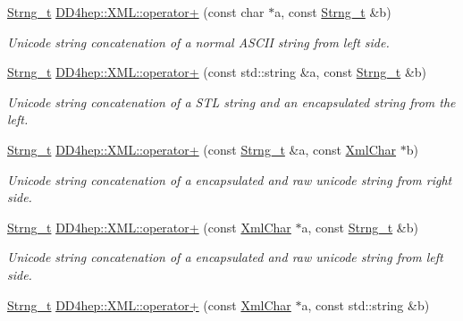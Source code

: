 \begin{DoxyCompactItemize}
\hyperlink{class_d_d4hep_1_1_x_m_l_1_1_strng__t}{Strng\+\_\+t} \hyperlink{group___d_d4_h_e_p___x_m_l_gad9d4f784bd934ca00c54efe28b42c7d2}{D\+D4hep\+::\+X\+M\+L\+::operator+} (const char $\ast$a, const \hyperlink{class_d_d4hep_1_1_x_m_l_1_1_strng__t}{Strng\+\_\+t} \&b)
\begin{DoxyCompactList}\small\item\em Unicode string concatenation of a normal A\+S\+C\+II string from left side. \end{DoxyCompactList}\item 
\hyperlink{class_d_d4hep_1_1_x_m_l_1_1_strng__t}{Strng\+\_\+t} \hyperlink{group___d_d4_h_e_p___x_m_l_gab7183a795b02243de6de9f3cd3665cb0}{D\+D4hep\+::\+X\+M\+L\+::operator+} (const std\+::string \&a, const \hyperlink{class_d_d4hep_1_1_x_m_l_1_1_strng__t}{Strng\+\_\+t} \&b)
\begin{DoxyCompactList}\small\item\em Unicode string concatenation of a S\+TL string and an encapsulated string from the left. \end{DoxyCompactList}\item 
\hyperlink{class_d_d4hep_1_1_x_m_l_1_1_strng__t}{Strng\+\_\+t} \hyperlink{group___d_d4_h_e_p___x_m_l_ga80dcfab5263e77bc2580f30c7d0e4f2e}{D\+D4hep\+::\+X\+M\+L\+::operator+} (const \hyperlink{class_d_d4hep_1_1_x_m_l_1_1_strng__t}{Strng\+\_\+t} \&a, const \hyperlink{namespace_d_d4hep_1_1_x_m_l_a09e5d9cc86ed782f6826dfe0778c1815}{Xml\+Char} $\ast$b)
\begin{DoxyCompactList}\small\item\em Unicode string concatenation of a encapsulated and raw unicode string from right side. \end{DoxyCompactList}\item 
\hyperlink{class_d_d4hep_1_1_x_m_l_1_1_strng__t}{Strng\+\_\+t} \hyperlink{group___d_d4_h_e_p___x_m_l_gafe9f9443003bbab38d67856960e62071}{D\+D4hep\+::\+X\+M\+L\+::operator+} (const \hyperlink{namespace_d_d4hep_1_1_x_m_l_a09e5d9cc86ed782f6826dfe0778c1815}{Xml\+Char} $\ast$a, const \hyperlink{class_d_d4hep_1_1_x_m_l_1_1_strng__t}{Strng\+\_\+t} \&b)
\begin{DoxyCompactList}\small\item\em Unicode string concatenation of a encapsulated and raw unicode string from left side. \end{DoxyCompactList}\item 
\hyperlink{class_d_d4hep_1_1_x_m_l_1_1_strng__t}{Strng\+\_\+t} \hyperlink{group___d_d4_h_e_p___x_m_l_ga818876f0e3a3be20c11eeb6ea2871bdc}{D\+D4hep\+::\+X\+M\+L\+::operator+} (const \hyperlink{namespace_d_d4hep_1_1_x_m_l_a09e5d9cc86ed782f6826dfe0778c1815}{Xml\+Char} $\ast$a, const std\+::string \&b)

\end{DoxyCompactItemize}
